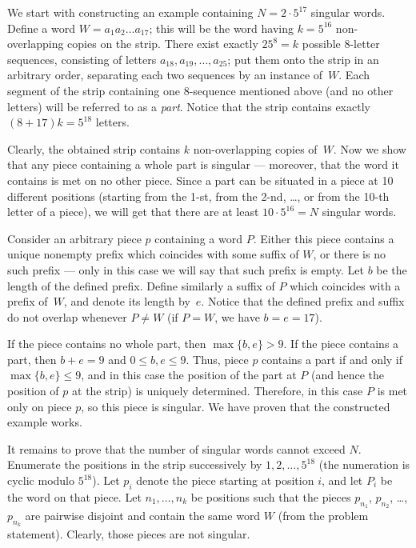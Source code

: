 \documentclass[12pt]{article}
\newcounter{problem}
\begin{document}
\medskip
We start with constructing an example containing $N=2\cdot 5^{17}$ singular words. Define a word $W=a_1a_2\dots a_{17}$; this will be the word having $k=5^{16}$ non-overlapping copies on the strip. There exist exactly $25^8=k$ possible 8-letter sequences, consisting of letters $a_{18}, a_{19}, \ldots, a_{25}$; put them onto the strip in an arbitrary order, separating each two sequences by an instance of~$W$. Each segment of the strip containing one 8-sequence mentioned above (and no other letters) will be referred to as a \emph{part}. Notice that the strip contains exactly $(8+17)k=5^{18}$ letters.

Clearly, the obtained strip contains $k$ non-overlapping copies of~$W$. Now we show that any piece containing a whole part is singular --- moreover, that the word it contains is met on no other piece. Since a part can be situated in a piece at 10 different positions (starting from the 1-st, from the 2-nd, \dots, or from the 10-th letter of a piece), we will get that there are at least  $10\cdot 5^{16}=N$ singular words.

\smallskip
Consider an arbitrary piece $p$ containing a word $P$. Either this piece contains a unique nonempty prefix which coincides with some suffix of $W$, or there is no such prefix --- only in this case we will say that such prefix is empty. Let $b$ be the length of the defined prefix. Define similarly a suffix of $P$ which coincides with a prefix of~$W$, and denote its length by~$e$. Notice that the defined prefix and suffix do not overlap whenever $P\neq W$ (if $P=W$, we have $b=e=17$).

If the piece contains no whole part, then $\max\{b,e\}>9$. If the piece contains a part, then $b+e=9$ and $0 \le b, e \le 9$. Thus, piece $p$ contains a part if and only if $\max\{b,e\}\leq 9$, and in this case the position of the part at $P$ (and hence the position of $p$ at the strip) is uniquely determined. Therefore, in this case $P$ is met only on piece $p$, so this piece is singular. We have proven that the constructed example works.

\medskip
It remains to prove that the number of singular words cannot exceed $N$. Enumerate the positions in the strip successively by $1,2,\dots,5^{18}$ (the numeration is cyclic modulo $5^{18}$). Let $p_i$ denote the piece starting at position $i$, and let $P_i$ be the word on that piece. Let $n_1,\dots,n_k$ be positions such that the pieces $p_{n_1}$, $p_{n_2}$, \dots, $p_{n_k}$ are pairwise disjoint and contain the same word $W$ (from the problem statement). Clearly, those pieces are not singular.
\end{document}
